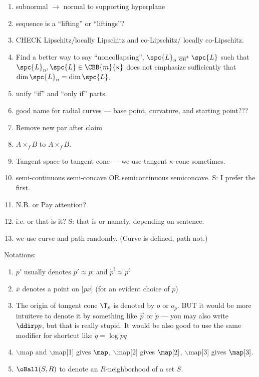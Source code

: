 \begin{enumerate}
\item subnormal $\to$ normal to supporting hyperplane

\item sequence is a ``lifting'' or ``liftings''?

\item CHECK Lipschitz/locally Lipschitz and co-Lipschitz/ locally co-Lipschitz.

\item Find a better way to say ``noncollapsing'', $\spc{L}_n\GHto \spc{L}$ such that $\spc{L}_n,\spc{L}\in \CBB{m}{\kappa}$ does not emphasize sufficiently that $\dim\spc{L}_n=\dim\spc{L}$.

\item unify ``if'' and ``only if'' parts.

\item good name for radial curves --- base point, curvature, and starting point???

\item Remove new par after claim

\item $A\times_f B$ to $A\mathrel{{\times}_f} B$.

\item Tangent space to tangent cone --- we use tangent $\kappa$-cone sometimes.

\item semi-continuous semi-concave OR semicontinuous semiconcave.  S: I prefer the first.

\item N.B. or Pay attention?

\item i.e. or that is it? S:  that is or namely, depending on sentence.

\item we use curve and path randomly.  (Curve is defined, path not.)

\end{enumerate}

Notations:
\begin{enumerate}
\item $p'$ usually denotes $p'\approx p$; 
and $\acute{p}^i\approx p^i$
\item $\bar x$ denotes a point on  $]p x]$ (for an evident choice of $p$)
\item The origin of tangent cone $\T_p$ is denoted by $o$ or $o_p$. BUT it would be more intuiteve to denote it by something like $\vec p$ or $\dot p$ --- you may also write $\ddir pp$, but that is really stupid.
It would be also good  to use the same modifier for shortcut like $\dot q=\log p q$
\item $\backslash$map and $\backslash$map[1] gives $\map$, $\backslash$map[2] gives $\map[2]$, $\backslash$map[3] gives $\map[3]$.
\item $\oBall(S,R)$  to denote an $R$-neighborhood of a set $S$.
\end{enumerate}

